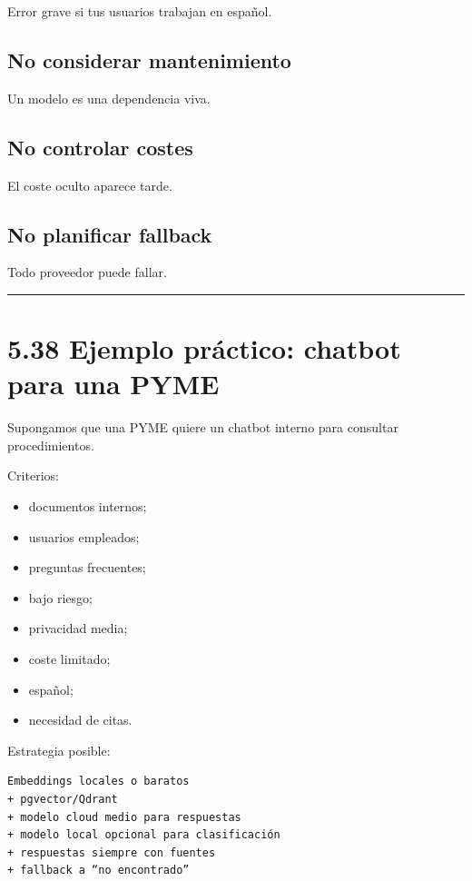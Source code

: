 Error grave si tus usuarios trabajan en español.

\subsection{No considerar
mantenimiento}\label{no-considerar-mantenimiento}

Un modelo es una dependencia viva.

\subsection{No controlar costes}\label{no-controlar-costes}

El coste oculto aparece tarde.

\subsection{No planificar fallback}\label{no-planificar-fallback}

Todo proveedor puede fallar.

\begin{center}\rule{0.5\linewidth}{0.5pt}\end{center}

\section{5.38 Ejemplo práctico: chatbot para una
PYME}\label{ejemplo-pruxe1ctico-chatbot-para-una-pyme}

Supongamos que una PYME quiere un chatbot interno para consultar
procedimientos.

Criterios:

\begin{itemize}
\tightlist
\item
  documentos internos;
\item
  usuarios empleados;
\item
  preguntas frecuentes;
\item
  bajo riesgo;
\item
  privacidad media;
\item
  coste limitado;
\item
  español;
\item
  necesidad de citas.
\end{itemize}

Estrategia posible:

\begin{lstlisting}
Embeddings locales o baratos
+ pgvector/Qdrant
+ modelo cloud medio para respuestas
+ modelo local opcional para clasificación
+ respuestas siempre con fuentes
+ fallback a “no encontrado”
\end{lstlisting}

